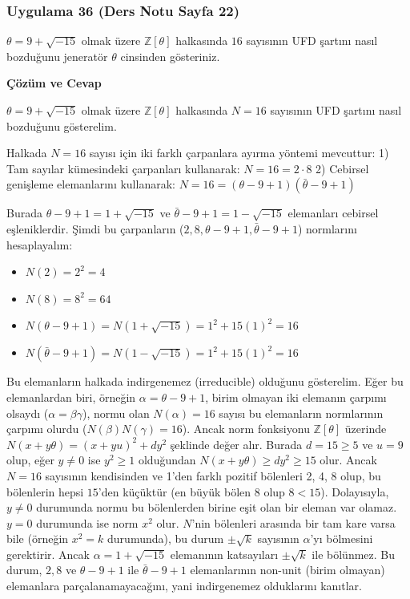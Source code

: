\documentclass[11pt, a4paper]{article}
\newenvironment{cozum}{
    \vspace{0.5cm}
    \noindent\textcolor{green!60!black}{\faCheckCircle\enspace \textbf{\Large Çözüm ve Cevap}}\par\vspace{0.2cm}
}{}
\begin{document}
\subsubsection{Uygulama 36 (Ders Notu Sayfa 22)}
\begin{sorubox}
$\theta = 9 + \sqrt{-15}$ olmak üzere $\mathbb{Z}[\theta]$ halkasında $16$ sayısının UFD şartını nasıl bozduğunu jeneratör $\theta$ cinsinden gösteriniz.
\end{sorubox}
\begin{cozum}
$\theta = 9 + \sqrt{-15}$ olmak üzere $\mathbb{Z}[\theta]$ halkasında $N = 16$ sayısının UFD şartını nasıl bozduğunu gösterelim.

Halkada $N = 16$ sayısı için iki farklı çarpanlara ayırma yöntemi mevcuttur:
1) Tam sayılar kümesindeki çarpanları kullanarak: $N = 16 = 2 \cdot 8$
2) Cebirsel genişleme elemanlarını kullanarak: $N = 16 = (\theta - 9 + 1)(\bar{\theta} - 9 + 1)$

Burada $\theta - 9 + 1 = 1 + \sqrt{-15}$ ve $\bar{\theta} - 9 + 1 = 1 - \sqrt{-15}$ elemanları cebirsel eşleniklerdir. Şimdi bu çarpanların ($2, 8, \theta - 9 + 1, \bar{\theta} - 9 + 1$) normlarını hesaplayalım:
\begin{itemize}
    \item $N(2) = 2^2 = 4$
    \item $N(8) = 8^2 = 64$
    \item $N(\theta - 9 + 1) = N(1 + \sqrt{-15}) = 1^2 + 15(1)^2 = 16$
    \item $N(\bar{\theta} - 9 + 1) = N(1 - \sqrt{-15}) = 1^2 + 15(1)^2 = 16$
\end{itemize}

Bu elemanların halkada indirgenemez (irreducible) olduğunu gösterelim. Eğer bu elemanlardan biri, örneğin $\alpha = \theta - 9 + 1$, birim olmayan iki elemanın çarpımı olsaydı ($\alpha = \beta \gamma$), normu olan $N(\alpha) = 16$ sayısı bu elemanların normlarının çarpımı olurdu ($N(\beta)N(\gamma) = 16$). Ancak norm fonksiyonu $\mathbb{Z}[\theta]$ üzerinde $N(x+y\theta) = (x+yu)^2 + dy^2$ şeklinde değer alır. Burada $d = 15 \ge 5$ ve $u = 9$ olup, eğer $y \neq 0$ ise $y^2 \ge 1$ olduğundan $N(x+y\theta) \ge dy^2 \ge 15$ olur. Ancak $N = 16$ sayısının kendisinden ve 1'den farklı pozitif bölenleri 2, 4, 8 olup, bu bölenlerin hepsi $15$'den küçüktür (en büyük bölen 8 olup $8 < 15$). Dolayısıyla, $y \neq 0$ durumunda normu bu bölenlerden birine eşit olan bir eleman var olamaz. $y = 0$ durumunda ise norm $x^2$ olur. $N$'nin bölenleri arasında bir tam kare varsa bile (örneğin $x^2 = k$ durumunda), bu durum $\pm \sqrt{k}$ sayısının $\alpha$'yı bölmesini gerektirir. Ancak $\alpha = 1+\sqrt{-15}$ elemanının katsayıları $\pm \sqrt{k}$ ile bölünmez. Bu durum, $2, 8$ ve $\theta - 9 + 1$ ile $\bar{\theta} - 9 + 1$ elemanlarının non-unit (birim olmayan) elemanlara parçalanamayacağını, yani indirgenemez olduklarını kanıtlar.


\end{cozum}
\end{document}

